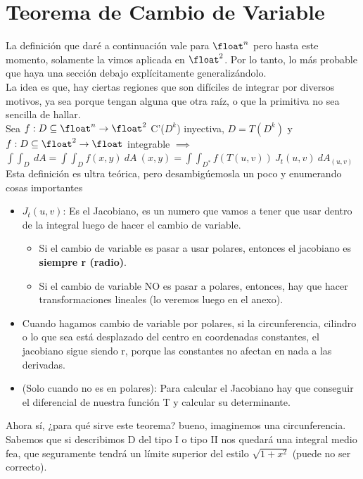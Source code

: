 \documentclass[10pt,a4paper]{article}
\begin{document}
\section*{Teorema de Cambio de Variable}
La definición que daré a continuación vale para $\float^{n}$ pero hasta este momento, solamente la vimos aplicada en $\float^{2}$. Por lo tanto, lo más probable que haya una sección debajo explícitamente generalizándolo. \\
La idea es que, hay ciertas regiones que son difíciles de integrar por diversos motivos, ya sea porque tengan alguna que otra raíz, o que la primitiva no sea sencilla de hallar. \\
Sea $f:D \subseteq \float^{n} \rightarrow \float^{2}$ C'($D^{k}$) inyectiva, $D = T(D^{k})$ y $f:D \subseteq \float^{2} \rightarrow \float$ integrable $\implies$ $\int \int_{D} \ dA = \int\int_{D}f(x,y) \ dA \ (x,y) = \int \int_{D^{*}}f(T(u,v)) \ J_{t}(u,v) \ dA_{(u,v)} $ \\
Esta definición es ultra teórica, pero desambigúemosla un poco y enumerando cosas importantes 
\begin{itemize}
    \item $J_{t}(u,v)$: Es el Jacobiano, es un numero que vamos a tener que usar dentro de la integral luego de hacer el cambio de variable. 
    \begin{itemize}
        \item Si el cambio de variable es pasar a usar polares, entonces el jacobiano es \textbf{siempre r (radio)}.
        \item Si el cambio de variable NO es pasar a polares, entonces, hay que hacer transformaciones lineales (lo veremos luego en el anexo).
    \end{itemize}
    \item Cuando hagamos cambio de variable por polares, si la circunferencia, cilindro o lo que sea está desplazado del centro en coordenadas constantes, el jacobiano sigue siendo r, porque las constantes no afectan en nada a las derivadas.
    \item (Solo cuando no es en polares): Para calcular el Jacobiano hay que conseguir el diferencial de nuestra función T y calcular su determinante. 
\end{itemize}
Ahora sí, ¿para qué sirve este teorema? bueno, imaginemos una circunferencia. Sabemos que si describimos D del tipo I o tipo II nos quedará una integral medio fea, que seguramente tendrá un límite superior del estilo $\sqrt{1+x^{2}}$ (puede no ser correcto). \\
\end{document}
